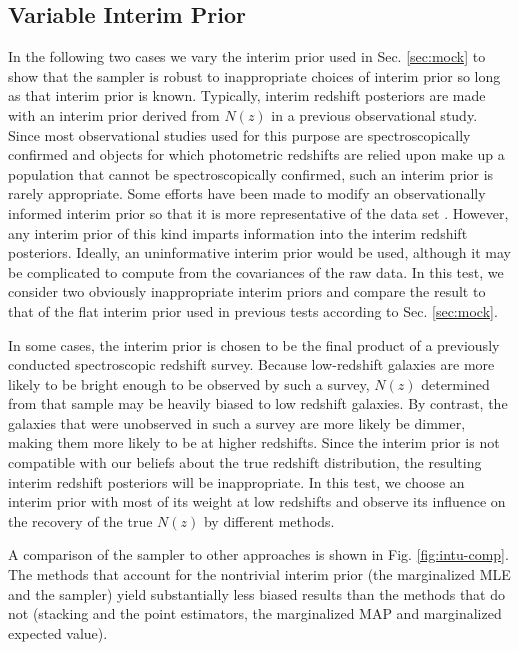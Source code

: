 \documentclass[preprint]{aastex}
\begin{document}
\subsection{Variable Interim Prior}
\label{sec:interim}

In the following two cases we vary the interim prior used in Sec. 
\ref{sec:mock} to show that the sampler is robust to inappropriate choices of 
interim prior so long as that interim prior is known.  Typically, interim 
redshift posteriors are made with an interim prior derived from $N(z)$ in a 
previous observational study.  Since most observational studies used for this 
purpose are spectroscopically confirmed and objects for which photometric 
redshifts are relied upon make up a population that cannot be spectroscopically 
confirmed, such an interim prior is rarely appropriate.  Some efforts have been 
made to modify an observationally informed interim prior so that it is more 
representative of the data set \citep{Sheldon2012}.  However, any interim prior 
of this kind imparts information into the interim redshift posteriors.  
Ideally, an uninformative interim prior would be used, although it may be 
complicated to compute from the covariances of the raw data.  In this test, we 
consider two obviously inappropriate interim priors and compare the result to 
that of the flat interim prior used in previous tests according to Sec. 
\ref{sec:mock}.

In some cases, the interim prior is chosen to be the final product of a 
previously conducted spectroscopic redshift survey.  Because low-redshift 
galaxies are more likely to be bright enough to be observed by such a survey, 
$N(z)$ determined from that sample may be heavily biased to low redshift 
galaxies.  By contrast, the galaxies that were unobserved in such a survey are 
more likely be dimmer, making them more likely to be at higher redshifts.  
Since the interim prior is not compatible with our beliefs about the true 
redshift distribution, the resulting interim redshift posteriors will be 
inappropriate.  In this test, we choose an interim prior with most of its 
weight at low redshifts and observe its influence on the recovery of the true 
$N(z)$ by different methods.  

A comparison of the sampler to other approaches is shown in Fig. 
\ref{fig:intu-comp}.  The methods that account for the nontrivial interim prior 
(the marginalized MLE and the sampler) yield substantially less biased results 
than the methods that do not (stacking and the point estimators, the 
marginalized MAP and marginalized expected value).
\end{document}
